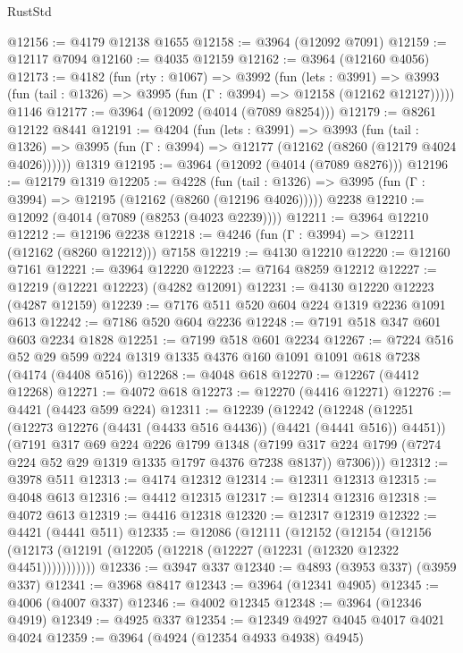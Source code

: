 \begin{lexlean}{RustStd}
\begin{coremodule}
{\begin{coremodule}
{{{{{{{{{{{{{{{{{{{{{{{{{{{{{{{{{{{{{{@12156 := @4179 @12138 @1655
@12158 := @3964 (@12092 @7091)
@12159 := @12117 @7094
@12160 := @4035 @12159
@12162 := @3964 (@12160 @4056)
@12173 := @4182
    (fun (rty : @1067) =>
    @3992
      (fun (lets : @3991) =>
      @3993 (fun (tail : @1326) => @3995 (fun (Γ : @3994) => @12158 (@12162 @12127)))))
    @1146
@12177 := @3964 (@12092 (@4014 (@7089 @8254)))
@12179 := @8261 @12122 @8441
@12191 := @4204
    (fun (lets : @3991) =>
    @3993
      (fun (tail : @1326) =>
      @3995 (fun (Γ : @3994) => @12177 (@12162 (@8260 (@12179 @4024 @4026))))))
    @1319
@12195 := @3964 (@12092 (@4014 (@7089 @8276)))
@12196 := @12179 @1319
@12205 := @4228
    (fun (tail : @1326) => @3995 (fun (Γ : @3994) => @12195 (@12162 (@8260 (@12196 @4026)))))
    @2238
@12210 := @12092 (@4014 (@7089 (@8253 (@4023 @2239))))
@12211 := @3964 @12210
@12212 := @12196 @2238
@12218 := @4246 (fun (Γ : @3994) => @12211 (@12162 (@8260 @12212))) @7158
@12219 := @4130 @12210
@12220 := @12160 @7161
@12221 := @3964 @12220
@12223 := @7164 @8259 @12212
@12227 := @12219 (@12221 @12223) (@4282 @12091)
@12231 := @4130 @12220 @12223 (@4287 @12159)
@12239 := @7176 @511 @520 @604 @224 @1319 @2236 @1091 @613
@12242 := @7186 @520 @604 @2236
@12248 := @7191 @518 @347 @601 @603 @2234 @1828
@12251 := @7199 @518 @601 @2234
@12267 := @7224
    @516
    @52
    @29
    @599
    @224
    @1319
    @1335
    @4376
    @160
    @1091
    @1091
    @618
    @7238
    (@4174 (@4408 @516))
@12268 := @4048 @618
@12270 := @12267 (@4412 @12268)
@12271 := @4072 @618
@12273 := @12270 (@4416 @12271)
@12276 := @4421 (@4423 @599 @224)
@12311 := @12239
    (@12242
      (@12248
        (@12251 (@12273 @12276 (@4431 (@4433 @516 @4436)) (@4421 (@4441 @516)) @4451))
        (@7191
          @317
          @69
          @224
          @226
          @1799
          @1348
          (@7199 @317 @224 @1799 (@7274 @224 @52 @29 @1319 @1335 @1797 @4376 @7238 @8137))
          @7306)))
@12312 := @3978 @511
@12313 := @4174 @12312
@12314 := @12311 @12313
@12315 := @4048 @613
@12316 := @4412 @12315
@12317 := @12314 @12316
@12318 := @4072 @613
@12319 := @4416 @12318
@12320 := @12317 @12319
@12322 := @4421 (@4441 @511)
@12335 := @12086
    (@12111
      (@12152
        (@12154
          (@12156 (@12173 (@12191 (@12205 (@12218 (@12227 (@12231 (@12320 @12322 @4451)))))))))))
@12336 := @3947 @337
@12340 := @4893 (@3953 @337) (@3959 @337)
@12341 := @3968 @8417
@12343 := @3964 (@12341 @4905)
@12345 := @4006 (@4007 @337)
@12346 := @4002 @12345
@12348 := @3964 (@12346 @4919)
@12349 := @4925 @337
@12354 := @12349 @4927 @4045 @4017 @4021 @4024
@12359 := @3964 (@4924 (@12354 @4933 @4938) @4945)
}}}}}}}}}}}}}}}}}}}}}}}}}}}}}}}}}}}}}}
\end{coremodule}}
\end{coremodule}
\end{lexlean}
